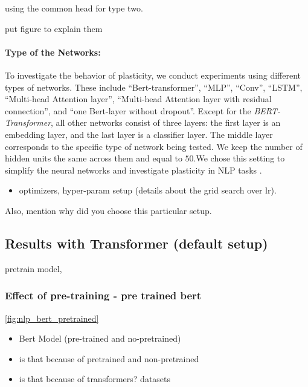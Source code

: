 using the common head for type two.

put figure to explain them

\paragraph{Type of the Networks:}
To investigate the behavior of plasticity, we conduct experiments using different types of networks. These include ``Bert-transformer'', ``MLP'', ``Conv'', ``LSTM'', ``Multi-head Attention layer'',  ``Multi-head Attention layer with residual connection'', and ``one Bert-layer without dropout''.  
Except for the \textit{BERT-Transformer}, all other networks consist of three layers: the first layer is an embedding layer, and the last layer is a classifier layer. The middle layer corresponds to the specific type of network being tested. We keep the number of hidden units the same across them and equal to $50$.We chose this setting to simplify the neural networks and investigate plasticity in NLP tasks .




\begin{itemize}
    \item optimizers, hyper-param setup (details about the grid search over lr).
\end{itemize}
Also, mention why did you choose this particular setup.


\subsection{Results with Transformer (default setup)}

pretrain model,

\subsubsection{Effect of pre-training - pre trained bert}
\autoref{fig:nlp_bert_pretrained}
\begin{itemize}
    \item Bert Model (pre-trained and no-pretrained)
    \item is that because of pretrained and non-pretrained
    \item is that because of transformers?
    datasets %
\end{itemize}

